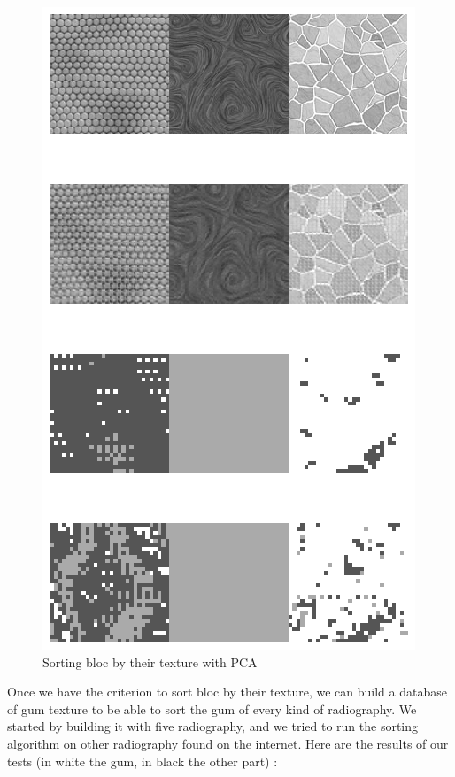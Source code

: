 \begin{figure}[H]
\centering
\includegraphics[scale=1]{images/testMethodeSegPCA.eps}
\caption{Sorting bloc by their texture with PCA}
\label{textPCA}
\end{figure}
Once we have the criterion to sort bloc by their texture, we can build a database of gum texture to be able to sort the gum of every kind of radiography. We started by building it with five radiography, and we tried to run the sorting algorithm on other radiography found on the internet. Here are the results of our tests (in white the gum, in black the other part) :
